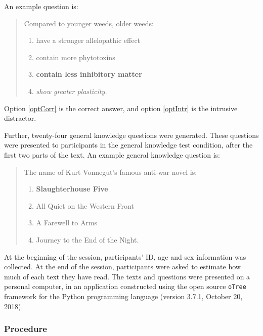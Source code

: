 \documentclass[12pt,]{article}
\begin{document}
\vspace{\parskip}

An example question is:

\begin{quotation}
\noindent Compared to younger weeds, older weeds:
\begin{enumerate}[label = (\alph*)]
\item have a stronger allelopathic effect
\item contain more phytotoxins
\item \label{optCorr} \textbf{contain less inhibitory matter}
\item \label{optIntr} \textit{show greater plasticity.}
\end{enumerate}
\end{quotation}

Option \ref{optCorr} is the correct answer, and option \ref{optIntr} is
the intrusive distractor.

Further, twenty-four general knowledge questions were generated. These
questions were presented to participants in the general knowledge test
condition, after the first two parts of the text. An example general
knowledge question is:

\begin{quotation}
\noindent The name of Kurt Vonnegut's famous anti-war novel is:
\begin{enumerate}[label = (\alph*)]
\item \textbf{Slaughterhouse Five}
\item All Quiet on the Western Front
\item A Farewell to Arms
\item Journey to the End of the Night.
\end{enumerate}
\end{quotation}

At the beginning of the session, participants' ID, age and sex
information was collected. At the end of the session, participants were
asked to estimate how much of each text they have read. The texts and
questions were presented on a personal computer, in an application
constructed using the open source \texttt{oTree} framework
\citep[version 2.0,][]{chen_otreeopen-source_2016} for the Python
programming language (version 3.7.1, October 20, 2018).

\hypertarget{procedure}{%
\subsubsection{Procedure}\label{procedure}}
\end{document}
